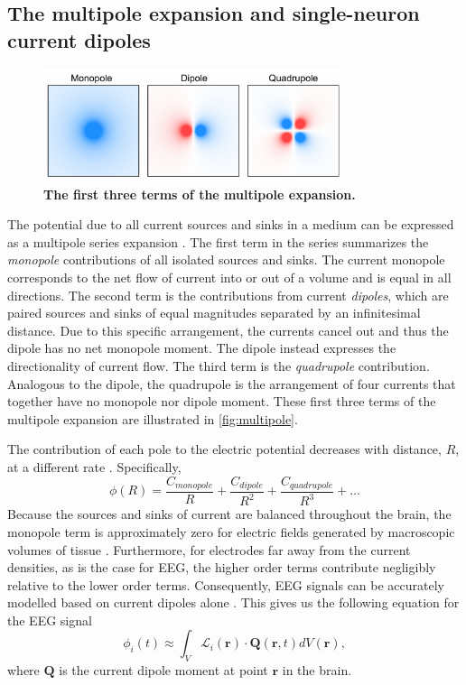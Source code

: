 \subsection{The multipole expansion and single-neuron current dipoles} \label{sec:dipoles}

\begin{figure}
\vspace{-17pt}
\centering
\includegraphics[width=88mm]{Figures/chapter1/multipole_expansion.pdf}
\vspace{-22pt}
\caption{\textbf{The first three terms of the multipole expansion.}}  \label{fig:multipole}
\end{figure}

The potential due to all current sources and sinks in a medium can be expressed as a multipole series expansion \cite{Nunez2006}. The first term in the series summarizes the \textit{monopole} contributions of all isolated sources and sinks. The current monopole corresponds to the net flow of current into or out of a volume and is equal in all directions. The second term is the contributions from current \textit{dipoles}, which are paired sources and sinks of equal magnitudes separated by an infinitesimal distance. Due to this specific arrangement, the currents cancel out and thus the dipole has no net monopole moment. The dipole instead expresses the directionality of current flow. The third term is the \textit{quadrupole} contribution. Analogous to the dipole, the quadrupole is the arrangement of four currents that together have no monopole nor dipole moment. These first three terms of the multipole expansion are illustrated in \autoref{fig:multipole}. 

The contribution of each pole to the electric potential decreases with distance, $R$, at a different rate \cite{Nunez2006}. Specifically,
\begin{equation*}
    \phi(R) = \frac{C_{monopole}}{R} + \frac{C_{dipole}}{R^2}  + \frac{C_{quadrupole}}{R^3}  + \dots
\end{equation*}
Because the sources and sinks of current are balanced throughout the brain, the monopole term is approximately zero for electric fields generated by macroscopic volumes of tissue \cite{Nunez2006}. Furthermore, for electrodes far away from the current densities, as is the case for EEG, the higher order terms contribute negligibly relative to the lower order terms. Consequently, EEG signals can be accurately modelled based on current dipoles alone \cite{Nunez2006,RevModPhys.65.413}. This gives us the following equation for the EEG signal \cite{RevModPhys.65.413}
\begin{equation} \label{eq:lead_solution}
    \phi_i(t) \approx \int_V \mathcal{L}_i(\bm{r}) \cdot \bm{Q}(\bm{r},t) dV(\bm{r})\mathrm{,}
\end{equation}
where $\bm{Q}$ is the current dipole moment at point $\bm{r}$ in the brain. 

